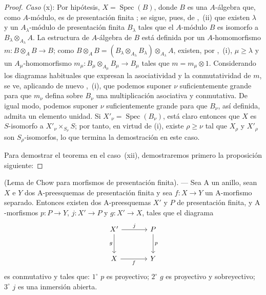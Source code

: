 \begin{proof}
\emph{Caso} (x): Por hipótesis, $X=\operatorname{Spec}(B)$, donde $B$ es una $A$-álgebra que, como $A$-módulo, es de presentación finita ; se sigue, pues, de ,~(ii) que existen $\lambda$ y un $A_\lambda$-módulo de presentación finita $B_\lambda$ tales que el $A$-módulo $B$ es isomorfo a $B_\lambda\otimes_{A_\lambda}A$.
La estructura de $A$-álgebra de $B$ está definida por un $A$-homomorfismo $m:B\otimes_A B\to B$; como $B\otimes_A B=(B_\lambda\otimes_{A_\lambda}B_\lambda)\otimes_{A_\lambda} A$, existen, por ,~(i), $\mu\geqslant\lambda$ y un $A_\mu$-homomorfismo $m_\mu:B_\mu\otimes_{A_\mu}B_\mu\to B_\mu$ tales que $m=m_\mu\otimes 1$.
Considerando los diagramas habituales que expresan la asociatividad y la conmutatividad de $m$, se ve, aplicando de nuevo ,~(i), que podemos suponer $\nu$ suficientemente grande para que $m_\nu$ defina sobre $B_\nu$ una multiplicación asociativa y conmutativa.
De igual modo, podemos suponer $\nu$ suficientemente grande para que $B_\nu$, así definida, admita un elemento unidad.
Si $X'_\nu=\operatorname{Spec}(B_\nu)$, está claro entonces que $X$ es $S$-isomorfo a $X'_\nu\times_{S_\nu}S$; por tanto, en virtud de (i), existe $\rho\geqslant\nu$ tal que $X_\rho$ y $X'_\rho$ son $S_\rho$-isomorfos, lo que termina la demostración en este caso.

Para demostrar el teorema en el caso~(xii), demostraremos primero la proposición siguiente:
\end{proof}

\begin{proposition}[8.10.5.1]
\label{IV.8.10.5.1}
(Lema de Chow para morfismos de presentación finita). --- Sea $\mathrm{A}$ un anillo, sean $X$ e $Y$ dos $\mathrm{A}$-preesquemas de presentación finita y sea $f:X\to Y$ un $\mathrm{A}$-morfismo separado. Entonces existen dos $\mathrm{A}$-preesquemas $X'$ y $P$ de presentación finita, y $\mathrm{A}$-morfismos $p:P\to Y$, $j:X'\to P$ y $g:X'\to X$, tales que el diagrama
\[
\begin{tikzcd}[column sep=large,row sep=large]
X' \arrow[r,"j"] \arrow[d,"g"'] & P \arrow[d,"p"] \\
X \arrow[r,"f"'] & Y
\end{tikzcd}
\]
es conmutativo y tales que: $1^\circ$ $p$ es proyectivo; $2^\circ$ $g$ es proyectivo y sobreyectivo; $3^\circ$ $j$ es una inmersión abierta.
\end{proposition}

